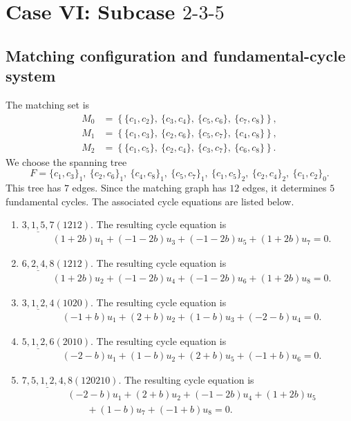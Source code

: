 \documentclass[11pt]{article}
\begin{document}
\section{Case VI: Subcase $2\text{-}3\text{-}5$}
\subsection{Matching configuration and fundamental-cycle system}
The matching set is
\[
\begin{aligned}
M_0&=\left\{\{c_{1},c_{2}\},\ \{c_{3},c_{4}\},\ \{c_{5},c_{6}\},\ \{c_{7},c_{8}\}\right\},\\
M_1&=\left\{\{c_{1},c_{3}\},\ \{c_{2},c_{6}\},\ \{c_{5},c_{7}\},\ \{c_{4},c_{8}\}\right\},\\
M_2&=\left\{\{c_{1},c_{5}\},\ \{c_{2},c_{4}\},\ \{c_{3},c_{7}\},\ \{c_{6},c_{8}\}\right\}.
\end{aligned}
\]
We choose the spanning tree
\[
F={\{c_{1},c_{3}\}_{1},\ \{c_{2},c_{6}\}_{1},\ \{c_{4},c_{8}\}_{1},\ \{c_{5},c_{7}\}_{1},\ \{c_{1},c_{5}\}_{2},\ \{c_{2},c_{4}\}_{2},\ \{c_{1},c_{2}\}_{0}}.
\]
This tree has $7$ edges.  Since the matching graph has $12$ edges, it determines $5$ fundamental cycles.  The associated cycle equations are listed below.
\begin{enumerate}[label=(\arabic*)]
\item $ \underline{3,1,5,7}(1212) $.  The resulting cycle equation is
\[
\begin{aligned}
&\left(1 + 2b\right)u_{1} + \left(-1 - 2b\right)u_{3} + \left(-1 - 2b\right)u_{5} + \left(1 + 2b\right)u_{7}=0.
\end{aligned}
\]
\item $ \underline{6,2,4,8}(1212) $.  The resulting cycle equation is
\[
\begin{aligned}
&\left(1 + 2b\right)u_{2} + \left(-1 - 2b\right)u_{4} + \left(-1 - 2b\right)u_{6} + \left(1 + 2b\right)u_{8}=0.
\end{aligned}
\]
\item $ \underline{3,1,2,4}(1020) $.  The resulting cycle equation is
\[
\begin{aligned}
&\left(-1 + b\right)u_{1} + \left(2 + b\right)u_{2} + \left(1 - b\right)u_{3} + \left(-2 - b\right)u_{4}=0.
\end{aligned}
\]
\item $ \underline{5,1,2,6}(2010) $.  The resulting cycle equation is
\[
\begin{aligned}
&\left(-2 - b\right)u_{1} + \left(1 - b\right)u_{2} + \left(2 + b\right)u_{5} + \left(-1 + b\right)u_{6}=0.
\end{aligned}
\]
\item $ \underline{7,5,1,2,4,8}(120210) $.  The resulting cycle equation is
\[
\begin{aligned}
&\left(-2 - b\right)u_{1} + \left(2 + b\right)u_{2} + \left(-1 - 2b\right)u_{4} + \left(1 + 2b\right)u_{5}\\ &\qquad  + \left(1 - b\right)u_{7} + \left(-1 + b\right)u_{8}=0.
\end{aligned}
\]
\end{enumerate}
\end{document}
